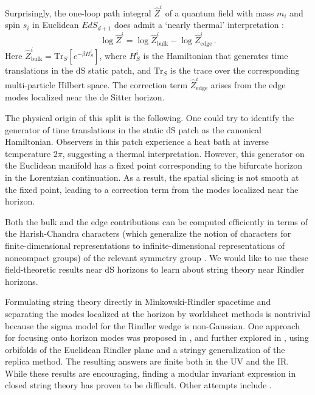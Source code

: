 \documentclass[aps,prl, reprint, superscriptaddress, 10pt]{revtex4-2}
\newcommand{\1}{\textbf{1}}
\newcommand{\Tr}{\mbox{Tr}}
\newcommand{\+}{{\,+ \,}}
\begin{document}
Surprisingly, the one-loop path integral $\hat{Z}^{i}$ of a quantum field with mass $m_i$ and spin $s_i$ in Euclidean $EdS_{d+1}$ does admit a `nearly thermal' interpretation \cite{Anninos:2020hfj}:
\begin{equation} \label{bulkedgePI}
	\log \hat{Z}^{i} = \log \hat Z^i_{\text{bulk}} - \log \hat Z^i_{\text{edge}} \, .
\end{equation}
Here $\hat Z^i_{\text{bulk}} = \Tr_S [ e^{-\beta H^i_S}]$, where $H^i_S$ is the Hamiltonian that generates time translations in the dS static patch, and $\Tr_S$ is the trace over the corresponding multi-particle Hilbert space. The correction term $\hat Z^i_{\text{edge}}$ arises from the edge modes localized near the de Sitter horizon.

The physical origin of this split is the following. One could try to identify the generator of time translations in the static dS patch as the canonical Hamiltonian. Observers in this patch experience a heat bath at inverse temperature $2\pi$, suggesting a thermal interpretation. However, this generator on the Euclidean manifold has a fixed point corresponding to the bifurcate horizon in the Lorentzian continuation. As a result, the spatial slicing is not smooth at the fixed point, leading to a correction term from the modes localized near the horizon.

Both the bulk and the edge contributions can be computed efficiently in terms of the Harish-Chandra characters (which generalize the notion of characters for finite-dimensional representations to infinite-dimensional representations of noncompact groups) of the relevant symmetry group \cite{HarishChandra:1956, HarishChandra:1963}. We would like to use these field-theoretic results near dS horizons to learn about string theory near Rindler horizons.

Formulating string theory directly in Minkowski-Rindler spacetime and separating the modes localized at the horizon by worldsheet methods is nontrivial because the sigma model for the Rindler wedge is non-Gaussian. One approach for focusing onto horizon modes was proposed in \cite{Dabholkar:1994ai}, and further explored in \cite{Dabholkar:2001if,He:2014gva,Mertens:2015adr,Witten:2018xfj,Dabholkar:2022mxo,Dabholkar:2023ows,Dabholkar:2023yqc,Dabholkar:2023tzd,Dabholkar:2024neq,Dabholkar:2025hri}, using orbifolds of the Euclidean Rindler plane and a stringy generalization of the replica method. The resulting answers are finite both in the UV and the IR. While these results are encouraging, finding a modular invariant expression in closed string theory has proven to be difficult. Other attempts include \cite{Donnelly:2016jet,Balasubramanian:2018axm, Ahmadain:2025pox}.
\end{document}
